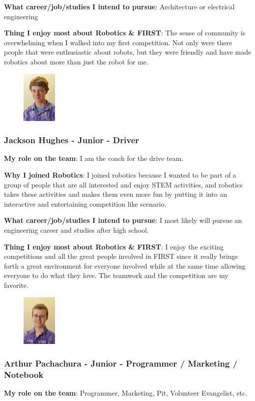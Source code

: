 {\bf What career/job/studies I intend to pursue}: Architecture or electrical engineering

{\bf Thing I enjoy most about Robotics \& FIRST}: The sense of community is overwhelming when I walked into my first competition. Not only were there people that were enthusiastic about robots, but they were friendly and have made robotics about more than just the robot for me. 

\begin{figure}
	\centering
	\includegraphics[height=1in]{jackson}
\end{figure}
\subsubsection{Jackson Hughes - Junior - Driver} 
{\bf My role on the team}: I am the coach for the drive team.

{\bf Why I joined Robotics}: I joined robotics because I wanted to be part of a group of people that are all interested and enjoy STEM activities, and robotics takes these activities and makes them even more fun by putting it into an interactive and entertaining competition like scenario.

{\bf What career/job/studies I intend to pursue}: I most likely will pursue an engineering career and studies after high school. 

{\bf Thing I enjoy most about Robotics \& FIRST}: I enjoy the exciting competitions and all the great people involved in FIRST since it really brings forth a great environment for everyone involved while at the same time allowing everyone to do what they love.  The teamwork and the competition are my favorite.  

\begin{figure}
	\centering
	\includegraphics[height=1in]{arthur}
\end{figure}
\subsubsection{Arthur Pachachura - Junior - Programmer /  Marketing / Notebook} 
{\bf My role on the team}: Programmer, Marketing, Pit, Volunteer Evangelist, etc.

